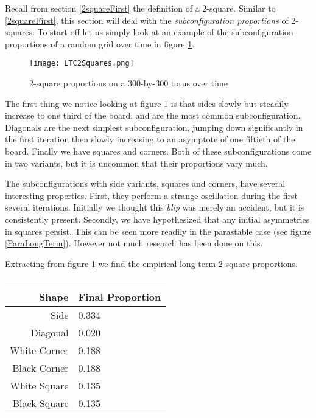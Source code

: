 \documentclass[12pt]{article}
\theoremstyle{definition}
\theoremstyle{remark}
\theoremstyle{remark}
\begin{document}
\par
Recall from section \ref{2squareFirst} the definition of a 2-square. Similar to \ref{2squareFirst}, this section will deal with the \emph{subconfiguration proportions} of 2-squares. To start off let us simply look at an example of the subconfiguration proportions of a random grid over time in figure \ref{2SquaresOverTime}.

\begin{figure}
  \centering
  \texttt{[image: LTC2Squares.png]}
  \caption{2-square proportions on a 300-by-300 torus over time}
  \label{2SquaresOverTime}
\end{figure}

\par
The first thing we notice looking at figure \ref{2SquaresOverTime} is that sides slowly but steadily increase to one third of the board, and are the most common subconfiguration. Diagonals are the next simplest subconfiguration, jumping down significantly in the first iteration then slowly increasing to an asymptote of one fiftieth of the board. Finally we have squares and corners. Both of these subconfigurations come in two variants, but it is uncommon that their proportions vary much. 

\par
The subconfigurations with side variants, squares and corners, have several interesting properties. First, they perform a strange oscillation during the first several iterations. Initially we thought this \emph{blip} was merely an accident, but it is consistently present. Secondly, we have hypothesized that any initial asymmetries in squares persist. This can be seen more readily in the parastable case (see figure \ref{ParaLongTerm}). However not much research has been done on this. 

\par
Extracting from figure \ref{2SquaresOverTime} we find the empirical long-term 2-square proportions.

\begin{table}[H]
\begin{tabular}{r|l}
  Shape & Final Proportion \\ \hline
  Side & 0.334 \\
  Diagonal & 0.020 \\
  White Corner & 0.188 \\
  Black Corner & 0.188 \\
  White Square & 0.135 \\
  Black Square & 0.135 \\  
\end{tabular}
\caption{}
\end{table}
\end{document}
